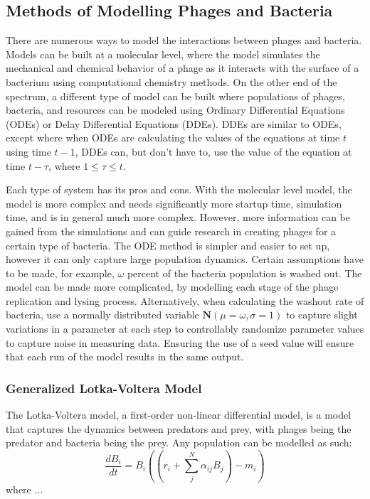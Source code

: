 \subsection{Methods of Modelling Phages and Bacteria}
There are numerous ways to model the interactions between phages and bacteria. Models can be built at a molecular level, where the model simulates the mechanical and chemical behavior of a phage as it interacts with the surface of a bacterium using computational chemistry methods. On the other end of the spectrum, a different type of model can be built where populations of phages, bacteria, and resources can be modeled using Ordinary Differential Equations (ODEs) or Delay Differential Equations (DDEs). DDEs are similar to ODEs, except where when ODEs are calculating the values of the equations at time $t$ using time $t-1$, DDEs can, but don't have to, use the value of the equation at time $t-\tau$, where $1 \leq \tau \leq t$. \newline 

Each type of system has its pros and cons. With the molecular level model, the model is more complex and needs significantly more startup time, simulation time, and is in general much more complex. However, more information can be gained from the simulations and can guide research in creating phages for a certain type of bacteria. The ODE method is simpler and easier to set up, however it can only capture large population dynamics. Certain assumptions have to be made, for example, $\omega$ percent of the bacteria population is washed out. The model can be made more complicated, by modelling each stage of the phage replication and lysing process. Alternatively, when calculating the washout rate of bacteria, use a normally distributed variable $\textbf{N}(\mu=\omega, \sigma=1)$ to capture slight variations in a parameter at each step to controllably randomize parameter values to capture noise in measuring data. Ensuring the use of a seed value will ensure that each run of the model results in the same output. 

\subsubsection{Generalized Lotka-Voltera Model}
The Lotka-Voltera model, a first-order non-linear differential model, is a model that captures the dynamics between predators and prey, with phages being the predator and bacteria being the prey. Any population can be modelled as such:
\[ 
    \frac{d{B}_i}{dt} = {B}_i \left(\left(r_i + \sum_{j}^{N} \alpha_{ij}{B}_j \right) - m_i\right)
\]
where ... 

